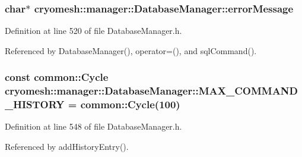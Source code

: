 \hypertarget{classcryomesh_1_1manager_1_1DatabaseManager_a090927bf06bda68c2f19f6c91997e606}{
\subsubsection[{error\-Message}]{\setlength{\rightskip}{0pt plus 5cm}char$\ast$ {\bf cryomesh\-::manager\-::\-Database\-Manager\-::error\-Message}}}\label{classcryomesh_1_1manager_1_1DatabaseManager_a090927bf06bda68c2f19f6c91997e606}


\-Definition at line 520 of file \-Database\-Manager.\-h.



\-Referenced by \-Database\-Manager(), operator=(), and sql\-Command().

\hypertarget{classcryomesh_1_1manager_1_1DatabaseManager_aa982e5617f8180e3a3cc848f860d69de}{
\subsubsection[{\-M\-A\-X\-\_\-\-C\-O\-M\-M\-A\-N\-D\-\_\-\-H\-I\-S\-T\-O\-R\-Y}]{\setlength{\rightskip}{0pt plus 5cm}const {\bf common\-::\-Cycle} {\bf cryomesh\-::manager\-::\-Database\-Manager\-::\-M\-A\-X\-\_\-\-C\-O\-M\-M\-A\-N\-D\-\_\-\-H\-I\-S\-T\-O\-R\-Y} = {\bf common\-::\-Cycle}(100)}}\label{classcryomesh_1_1manager_1_1DatabaseManager_aa982e5617f8180e3a3cc848f860d69de}


\-Definition at line 548 of file \-Database\-Manager.\-h.



\-Referenced by add\-History\-Entry().

